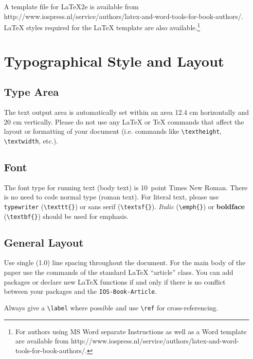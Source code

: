 \documentclass{IOS-Book-Article}
\begin{document}
A template file for \LaTeX2e is available from http://www.iospress.nl/service/authors/\allowbreak latex-and-word-tools-for-book-authors/. \LaTeX{} styles required for the \LaTeX{} template are also
available.\footnote{For authors using MS Word separate Instructions as well
as a Word template are available from http://www.iospress.nl/service/authors/latex-and-word-tools-for-book-authors/.}

\section{Typographical Style and Layout}

\subsection{Type Area}
The text output area is automatically set within an area 12.4 cm
horizontally and 20 cm vertically. Please do not use any
\LaTeX{} or \TeX{} commands that affect the layout or formatting of
your document (i.e. commands like \verb|\textheight|,
\verb|\textwidth|, etc.).



\subsection{Font}

The font type for running text (body text) is 10~point Times New Roman.
There is no need to code normal type (roman text). For literal text, please use
\texttt{type\-writer} (\verb|\texttt{}|)
or \textsf{sans serif} (\verb|\textsf{}|). \emph{Italic} (\verb|\emph{}|)
or \textbf{boldface} (\verb|\textbf{}|) should be used for emphasis.

\subsection{General Layout}
Use single (1.0) line spacing throughout the document. For the main
body of the paper use the commands of the standard \LaTeX{}
``article'' class. You can add packages or declare new \LaTeX{}
functions if and only if there is no conflict between your packages
and the \texttt{IOS-Book-Article}.

Always give a \verb|\label| where possible and use \verb|\ref| for cross-referencing.
\end{document}
